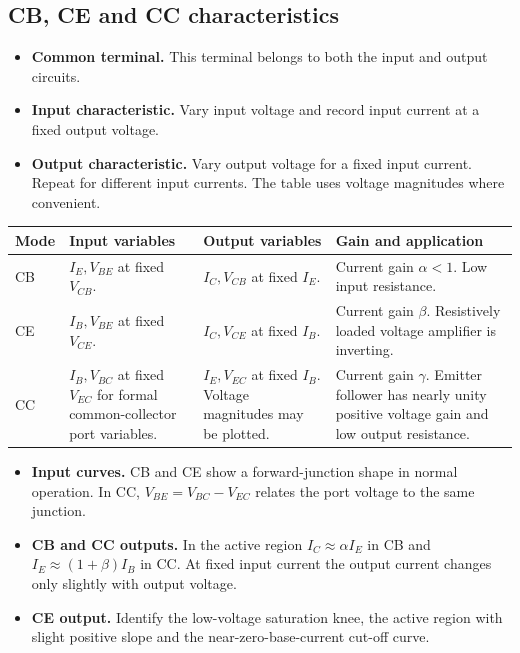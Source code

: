 \documentclass[12pt,a4paper]{article}
\begin{document}
\subsection{CB, CE and CC characteristics}
\begin{itemize}[leftmargin=*, itemsep=3pt, topsep=4pt]
  \item \textbf{Common terminal.} This terminal belongs to both the input and output circuits.
  \item \textbf{Input characteristic.} Vary input voltage and record input current at a fixed output voltage.
  \item \textbf{Output characteristic.} Vary output voltage for a fixed input current. Repeat for different input currents. The table uses voltage magnitudes where convenient.
\end{itemize}
\par\vspace{6pt}\noindent
\begin{tabularx}{\linewidth}{|B{2cm}|Y|Y|Y|}\hline
Mode & \textbf{Input variables} & \textbf{Output variables} & \textbf{Gain and application} \\ \hline
CB & \(I_E,V_{BE}\) at fixed \(V_{CB}\). & \(I_C,V_{CB}\) at fixed \(I_E\). & Current gain \(\alpha<1\). Low input resistance. \\ \hline
CE & \(I_B,V_{BE}\) at fixed \(V_{CE}\). & \(I_C,V_{CE}\) at fixed \(I_B\). & Current gain \(\beta\). Resistively loaded voltage amplifier is inverting. \\ \hline
CC & \(I_B,V_{BC}\) at fixed \(V_{EC}\) for formal common-collector port variables. & \(I_E,V_{EC}\) at fixed \(I_B\). Voltage magnitudes may be plotted. & Current gain \(\gamma\). Emitter follower has nearly unity positive voltage gain and low output resistance. \\ \hline
\end{tabularx}

\begin{itemize}[leftmargin=*, itemsep=3pt, topsep=4pt]
  \item \textbf{Input curves.} CB and CE show a forward-junction shape in normal operation. In CC, \(V_{BE}=V_{BC}-V_{EC}\) relates the port voltage to the same junction.
  \item \textbf{CB and CC outputs.} In the active region \(I_C\approx\alpha I_E\) in CB and \(I_E\approx(1+\beta)I_B\) in CC. At fixed input current the output current changes only slightly with output voltage.
  \item \textbf{CE output.} Identify the low-voltage saturation knee, the active region with slight positive slope and the near-zero-base-current cut-off curve.
\end{itemize}
\end{document}
